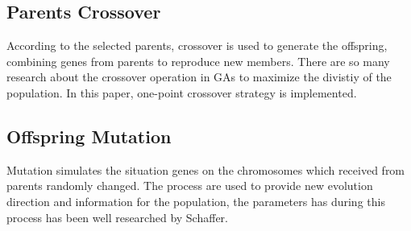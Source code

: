 \documentclass[smallextended]{svjour3}       %
\begin{document}
\begin{multicols}{2}
\subsection{Parents Crossover}
According to the selected parents, crossover is used to generate the offspring,
combining genes from parents to reproduce new members. There are so many
research \cite{ahmed2010genetic,nebro2009mocell} about the crossover operation
in GAs to maximize the divistiy of the population. In this paper, one-point
crossover strategy is implemented.

\subsection{Offspring Mutation}
Mutation simulates the situation  genes on the chromosomes which received from
parents randomly changed.  The process are used to provide new evolution
direction and information for the population, the parameters has during this
process has been well researched by Schaffer\cite{schaffer1989study}.  



\end{multicols}
\end{document}
